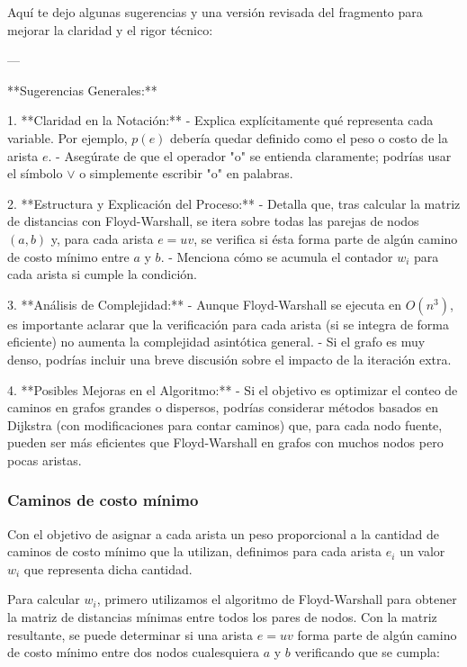 \documentclass[a4paper]{article}
\begin{document}
Aquí te dejo algunas sugerencias y una versión revisada del fragmento para mejorar la claridad y el rigor técnico:

---

**Sugerencias Generales:**

1. **Claridad en la Notación:**  
   - Explica explícitamente qué representa cada variable. Por ejemplo, \(p(e)\) debería quedar definido como el peso o costo de la arista \(e\).
   - Asegúrate de que el operador "o" se entienda claramente; podrías usar el símbolo \(\lor\) o simplemente escribir "o" en palabras.

2. **Estructura y Explicación del Proceso:**  
   - Detalla que, tras calcular la matriz de distancias con Floyd-Warshall, se itera sobre todas las parejas de nodos \((a, b)\) y, para cada arista \(e = uv\), se verifica si ésta forma parte de algún camino de costo mínimo entre \(a\) y \(b\).
   - Menciona cómo se acumula el contador \(w_i\) para cada arista si cumple la condición.

3. **Análisis de Complejidad:**  
   - Aunque Floyd-Warshall se ejecuta en \(O(n^3)\), es importante aclarar que la verificación para cada arista (si se integra de forma eficiente) no aumenta la complejidad asintótica general.  
   - Si el grafo es muy denso, podrías incluir una breve discusión sobre el impacto de la iteración extra.

4. **Posibles Mejoras en el Algoritmo:**  
   - Si el objetivo es optimizar el conteo de caminos en grafos grandes o dispersos, podrías considerar métodos basados en Dijkstra (con modificaciones para contar caminos) que, para cada nodo fuente, pueden ser más eficientes que Floyd-Warshall en grafos con muchos nodos pero pocas aristas.


\subsubsection{Caminos de costo mínimo}

Con el objetivo de asignar a cada arista un peso proporcional a la cantidad de caminos de costo mínimo que la utilizan, definimos para cada arista \(e_i\) un valor \(w_i\) que representa dicha cantidad.

Para calcular \(w_i\), primero utilizamos el algoritmo de Floyd-Warshall para obtener la matriz de distancias mínimas entre todos los pares de nodos. Con la matriz resultante, se puede determinar si una arista \(e = uv\) forma parte de algún camino de costo mínimo entre dos nodos cualesquiera \(a\) y \(b\) verificando que se cumpla:
\end{document}
